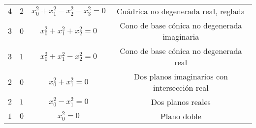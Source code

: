 \begin{example}
\begin{enumerate}[i)]
\begin{center}
\begin{tabular}{ c c c c }
           $4$ & $2$ & $x_0^2 + x_1^2 - x_2^2 - x_3^2 = 0$ & Cuádrica no degenerada real, reglada \\  
           $3$ & $0$ & $x_0^2 + x_1^2 + x_2^2 = 0$ & Cono de base cónica no degenerada imaginaria\\  
           $3$ & $1$ & $x_0^2 + x_1^2 - x_2^2 = 0$ &  Cono de base cónica no degenerada real \\
           $2$ & $0$ & $x_0^2 + x_1^2 = 0$ & Dos planos imaginarios con intersección real\\
           $2$ & $1$ & $x_0^2 - x_1^2 = 0$ & Dos planos reales\\
           $1$ & $0$ & $x_0^2 = 0$ & Plano doble
        \end{tabular}
      \end{center}
  \end{enumerate}
\end{example}

